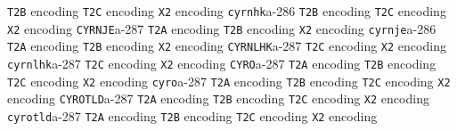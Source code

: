 \documentclass[twoside]{ltxdoc}
\makeatletter
\renewenvironment{theindex}{%
   \@restonecoltrue
   \if@twocolumn\@restonecolfalse\fi
   \columnseprule \z@
   \columnsep 35\p@
   \twocolumn[\index@prologue]%
   \IndexParms
   \let\item\@idxitem
   \ignorespaces
}{\if@restonecol\onecolumn\else\clearpage\fi}
\makeatother
\begin{document}
\begin{theindex}
    \subitem \texttt  {T2B} encoding\pfill {}
    \subitem \texttt  {T2C} encoding\pfill {}
    \subitem \texttt  {X2} encoding\pfill {}
  \item \texttt  {cyrnhk}\pfill a-286
    \subitem \texttt  {T2B} encoding\pfill {}
    \subitem \texttt  {T2C} encoding\pfill {}
    \subitem \texttt  {X2} encoding\pfill {}
  \item \texttt  {CYRNJE}\pfill a-287
    \subitem \texttt  {T2A} encoding\pfill {}
    \subitem \texttt  {T2B} encoding\pfill {}
    \subitem \texttt  {X2} encoding\pfill {}
  \item \texttt  {cyrnje}\pfill a-286
    \subitem \texttt  {T2A} encoding\pfill {}
    \subitem \texttt  {T2B} encoding\pfill {}
    \subitem \texttt  {X2} encoding\pfill {}
  \item \texttt  {CYRNLHK}\pfill a-287
    \subitem \texttt  {T2C} encoding\pfill {}
    \subitem \texttt  {X2} encoding\pfill {}
  \item \texttt  {cyrnlhk}\pfill a-287
    \subitem \texttt  {T2C} encoding\pfill {}
    \subitem \texttt  {X2} encoding\pfill {}
  \item \texttt  {CYRO}\pfill a-287
    \subitem \texttt  {T2A} encoding\pfill {}
    \subitem \texttt  {T2B} encoding\pfill {}
    \subitem \texttt  {T2C} encoding\pfill {}
    \subitem \texttt  {X2} encoding\pfill {}
  \item \texttt  {cyro}\pfill a-287
    \subitem \texttt  {T2A} encoding\pfill {}
    \subitem \texttt  {T2B} encoding\pfill {}
    \subitem \texttt  {T2C} encoding\pfill {}
    \subitem \texttt  {X2} encoding\pfill {}
  \item \texttt  {CYROTLD}\pfill a-287
    \subitem \texttt  {T2A} encoding\pfill {}
    \subitem \texttt  {T2B} encoding\pfill {}
    \subitem \texttt  {T2C} encoding\pfill {}
    \subitem \texttt  {X2} encoding\pfill {}
  \item \texttt  {cyrotld}\pfill a-287
    \subitem \texttt  {T2A} encoding\pfill {}
    \subitem \texttt  {T2B} encoding\pfill {}
    \subitem \texttt  {T2C} encoding\pfill {}
    \subitem \texttt  {X2} encoding\pfill {}

\end{theindex}
\end{document}
